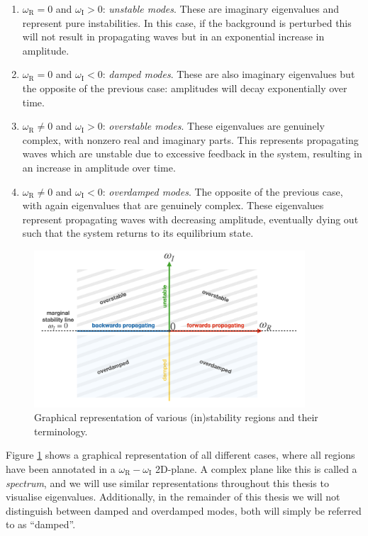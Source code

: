 \begin{enumerate}
  \item $\omega_\text{R} = 0$ and $\omega_\text{I} > 0$: \emph{unstable modes}. These are imaginary eigenvalues and represent pure instabilities. In this case, if the background is perturbed this will not result in propagating waves but in an exponential increase in amplitude.
  \item $\omega_\text{R} = 0$ and $\omega_\text{I} < 0$: \emph{damped modes}. These are also imaginary eigenvalues but the opposite of the previous case: amplitudes will decay exponentially over time.
  \item $\omega_\text{R} \neq 0$ and $\omega_\text{I} > 0$: \emph{overstable modes}. These eigenvalues are genuinely complex, with nonzero real and imaginary parts. This represents propagating waves which are unstable due to excessive feedback in the system, resulting in an increase in amplitude over time.
  \item$\omega_\text{R} \neq 0$ and $\omega_\text{I} < 0$: \emph{overdamped modes}. The opposite of the previous case, with again eigenvalues that are genuinely complex. These eigenvalues represent propagating waves with decreasing amplitude, eventually dying out such that the system returns to its equilibrium state.
\end{enumerate}

\begin{figure}[b]
  \centering
  \includegraphics[width=0.9\textwidth]{spectral_plane.png}
  \caption{Graphical representation of various (in)stability regions and their terminology.}
  \label{fig: spectral_plane}
\end{figure}

Figure \ref{fig: spectral_plane} shows a graphical representation of all different cases, where all regions have been annotated in a $\omega_\text{R} - \omega_\text{I}$ 2D-plane. A complex plane like this is called a \emph{spectrum}, and we will use similar representations throughout this thesis to visualise eigenvalues. Additionally, in the remainder of this thesis we will not distinguish between damped and overdamped modes, both will simply be referred to as ``damped''.


